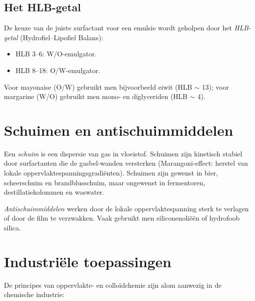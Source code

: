 \subsection{Het HLB-getal}

De keuze van de juiste surfactant voor een emulsie wordt geholpen door het \emph{HLB-getal} (Hydrofiel--Lipofiel Balans):
\begin{itemize}
\item HLB 3--6: W/O-emulgator.
\item HLB 8--18: O/W-emulgator.
\end{itemize}
Voor mayonaise (O/W) gebruikt men bijvoorbeeld eiwit (HLB $\sim$ 13); voor margarine (W/O) gebruikt men mono- en diglyceriden (HLB $\sim$ 4).

\section{Schuimen en antischuimmiddelen}

Een \emph{schuim} is een dispersie van gas in vloeistof. Schuimen zijn kinetisch stabiel door surfactanten die de gasbel-wanden versterken (Marangoni-effect: herstel van lokale oppervlaktespanningsgradi\"enten). Schuimen zijn gewenst in bier, scheerschuim en brandblusschuim, maar ongewenst in fermentoren, destillatiekolommen en waswater.

\emph{Antischuimmiddelen} werken door de lokale oppervlaktespanning sterk te verlagen of door de film te verzwakken. Vaak gebruikt men siliconenoli\"e\"en of hydrofoob silica.

\section{Industri\"ele toepassingen}

De principes van oppervlakte- en collo\"idchemie zijn alom aanwezig in de chemische industrie:

